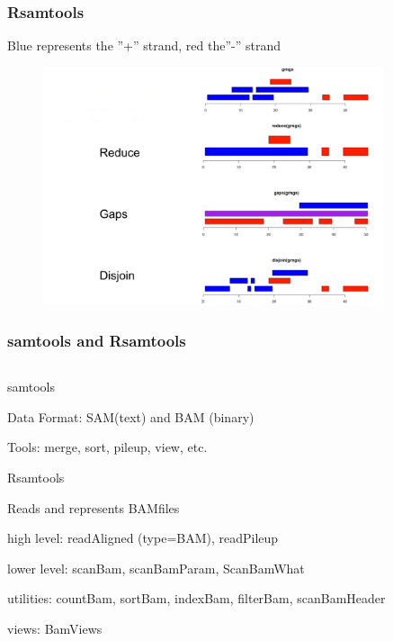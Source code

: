 \documentclass{beamer}
\begin{document}

\begin{frame}
\frametitle{Rsamtools}
Blue represents the ''+'' strand, red the''-'' strand
 \begin{figure}[ht]
    \centering
    \includegraphics[width=100mm]{diagramas/Seleccio_009.png}
  \end{figure}
\end{frame}


\begin{frame}
\frametitle{samtools and Rsamtools}
\begin{column}{1\textwidth}
  \bit
      \item samtools
        \bit
            \item Data Format: SAM(text) and BAM (binary)
            \item Tools: merge, sort, pileup, view, etc.
        \eit
      \item Rsamtools
        \bit
            \item Reads and represents BAMfiles
            \item high level: readAligned (type=BAM), readPileup
            \item lower level: scanBam, scanBamParam, ScanBamWhat
            \item utilities: countBam, sortBam, indexBam, filterBam, scanBamHeader
            \item views: BamViews
        \eit
  \eit
  \end{column}
\end{frame}
\end{document}
